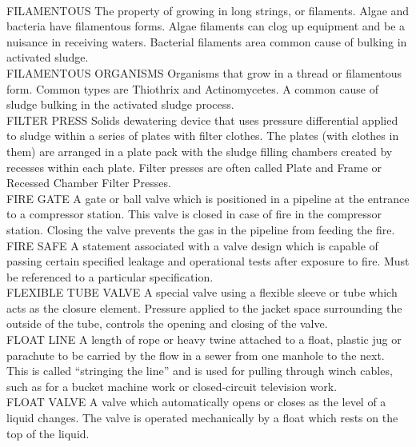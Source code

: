 \vspace{0.3cm}\\
FILAMENTOUS
The property of growing in long strings, or filaments. Algae and bacteria have filamentous forms. Algae filaments can clog up equipment and be a nuisance in receiving waters. Bacterial filaments area common cause of bulking in activated sludge.
\vspace{0.3cm}\\
FILAMENTOUS ORGANISMS
Organisms that grow in a thread or filamentous form. Common types are Thiothrix and Actinomycetes. A common cause of sludge bulking in the activated sludge process.
\vspace{0.3cm}\\
FILTER PRESS
Solids dewatering device that uses pressure differential applied to sludge within a series of plates with filter clothes. The plates (with clothes in them) are arranged in a plate pack with the sludge filling chambers created by recesses within each plate. Filter presses are often called Plate and Frame or Recessed Chamber Filter Presses.
\vspace{0.3cm}\\
FIRE GATE
A gate or ball valve which is positioned in a pipeline at the entrance to a compressor station. This valve is closed in case of fire in the compressor station. Closing the valve prevents the gas in the pipeline from feeding the fire.
\vspace{0.3cm}\\
FIRE SAFE
A statement associated with a valve design which is capable of passing certain specified leakage and operational tests after exposure to fire. Must be referenced to a particular specification.
\vspace{0.3cm}\\
FLEXIBLE TUBE VALVE
A special valve using a flexible sleeve or tube which acts as the closure element. Pressure applied to the jacket space surrounding the outside of the tube, controls the opening and closing of the valve.
\vspace{0.3cm}\\
FLOAT LINE
A length of rope or heavy twine attached to a float, plastic jug or parachute to be carried by the flow in a sewer from one manhole to the next. This is called “stringing the line” and is used for pulling through winch cables, such as for a bucket machine work or closed-circuit television work. 
\vspace{0.3cm}\\
FLOAT VALVE
A valve which automatically opens or closes as the level of a liquid changes. The valve is operated mechanically by a float which rests on the top of the liquid.
